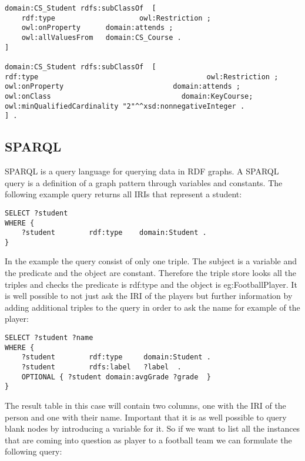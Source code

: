 \begin{lstlisting}[basicstyle=\footnotesize, captionpos=b, caption=Restrictions defined as blank nodes, label=lst:sparql, belowskip=1em, aboveskip=2em,
frame=single]
domain:CS_Student rdfs:subClassOf  [ 
	rdf:type					owl:Restriction ; 
	owl:onProperty		domain:attends ; 
	owl:allValuesFrom	domain:CS_Course .
]

domain:CS_Student rdfs:subClassOf  [
rdf:type										owl:Restriction ; 
owl:onProperty							domain:attends ; 
owl:onClass								  domain:KeyCourse; 
owl:minQualifiedCardinality "2"^^xsd:nonnegativeInteger .
] .
\end{lstlisting}


\subsection{SPARQL}

SPARQL is a query language for querying data in RDF graphs. A SPARQL query is a definition of a graph pattern through variables and constants. The following example query returns all IRIs that represent a student: 

\begin{lstlisting}[captionpos=b, caption=SPARQL Query I., label=lst:sparql, belowskip=1em, aboveskip=2em, 
basicstyle=\footnotesize,frame=single]
SELECT ?student  
WHERE { 
	?student		rdf:type	domain:Student .	
}
\end{lstlisting}

In the example the query consist of only one triple. The subject is a variable and the predicate and the object are constant. Therefore the triple store looks all the triples and checks the predicate is rdf:type and the object is eg:FootballPlayer. 
It is well possible to not just ask the IRI of the players but further information by adding additional triples to the query in order to ask the name for example of the player:

\begin{lstlisting}[captionpos=b, caption=SPARQL Query II., label=2nd:sparql, belowskip=1em, aboveskip=2em,
basicstyle=\footnotesize,frame=single]
SELECT ?student ?name 
WHERE { 
	?student		rdf:type	 domain:Student .	
	?student		rdfs:label	 ?label  .
	OPTIONAL { ?student	domain:avgGrade	?grade  } 
}
\end{lstlisting}

The result table in this case will contain two columns, one with the IRI of the person and one with their name. Important that it is as well possible to query blank nodes by introducing a variable for it. So if we want to list all the instances that are coming into question as player to a football team we can formulate the following query:

